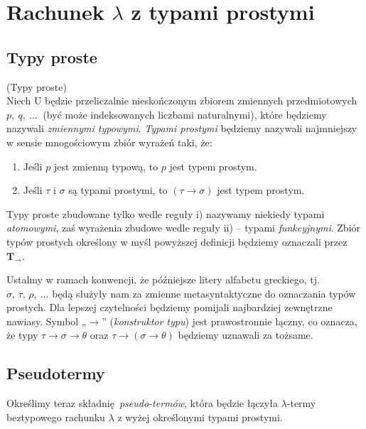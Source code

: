 \section{Rachunek \(\lambda\) z typami prostymi}


\subsection{Typy proste}
\begin{definicja}(Typy proste)\\
  Niech \(\mathrm{U}\) będzie przeliczalnie nieskończonym zbiorem zmiennych przedmiotowych \(p,\ q,\ \dots\ \) (być może indeksowanych liczbami naturalnymi), które będziemy nazywali \emph{zmiennymi typowymi}. \emph{Typami prostymi} będziemy nazywali najmniejszy w sensie mnogościowym zbiór wyrażeń taki, że:
\begin{enumerate}[label=\roman*)]
  \item Jeśli \(p\) jest zmienną typową, to \(p\) jest typem prostym.
  \item Jeśli \(\tau\) i \(\sigma\) są typami prostymi, to \(\left(\tau\to\sigma\right)\) jest typem prostym.
\end{enumerate}
\end{definicja}

Typy proste zbudowane tylko wedle reguły i) nazywamy niekiedy typami \emph{atomowymi}, zaś wyrażenia zbudowe wedle reguły ii) – typami \emph{funkcyjnymi}. Zbiór typów prostych określony w myśl powyższej definicji będziemy oznaczali przez \(\mathbf{T_\to}\).

Ustalmy w ramach konwencji, że późniejsze litery alfabetu greckiego, tj. \(\sigma,\, \tau,\, \rho,\ \dots\) będą służyły nam za zmienne metasyntaktyczne do oznaczania typów prostych. Dla lepszej czytelności będziemy pomijali najbardziej zewnętrzne nawiasy. Symbol „\(\to\)”  (\emph{konstruktor typu}) jest prawostronnie łączny, co oznacza, że typy \(\tau\to\sigma\to\theta\) oraz \(\tau\to(\sigma\to\theta)\) będziemy uznawali za tożsame.


\subsection{Pseudotermy}
Określimy teraz składnię \emph{pseudo-termów}, która będzie łączyła \(\lambda\)-termy beztypowego rachunku \(\lambda\) z wyżej określonymi typami prostymi.

